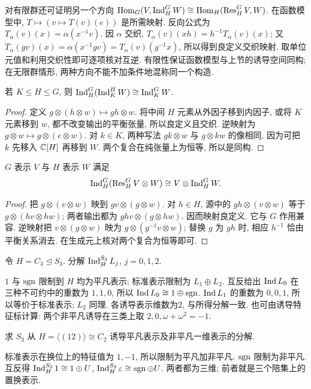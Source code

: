 对有限群还可证明另一个方向
$\operatorname{Hom}_G(V,\operatorname{Ind}_H^G W)\cong\operatorname{Hom}_H(\operatorname{Res}_H^G V,W)$. 在函数模型中, $T\mapsto(v\mapsto T(v)(e))$ 是所需映射. 反向公式为 $T_\alpha(v)(x)=\alpha(x^{-1}v)$. 因 $\alpha$ 交织,
$T_\alpha(v)(xh)=h^{-1}T_\alpha(v)(x)$; 又
$T_\alpha(gv)(x)=\alpha(x^{-1}gv)=T_\alpha(v)(g^{-1}x)$, 所以得到良定义交织映射. 取单位元值和利用交织性即可逐项核对互逆. 有限性保证函数模型与上节的诱导空间同构; 在无限群情形, 两种方向不能不加条件地混称同一个构造.

\begin{proposition}\label{prop:transitivity}
若 $K\le H\le G$, 则 $\operatorname{Ind}_H^G(\operatorname{Ind}_K^H W)\cong\operatorname{Ind}_K^G W$.
\end{proposition}
\begin{proof}
定义 $g\otimes(h\otimes w)\mapsto gh\otimes w$. 将中间 $H$ 元素从外因子移到内因子, 或将 $K$ 元素移到 $w$, 都不改变输出的平衡张量, 所以良定义且交织. 逆映射为 $g\otimes w\mapsto g\otimes(e\otimes w)$. 对 $k\in K$, 两种写法 $gk\otimes w$ 与 $g\otimes kw$ 的像相同, 因为可把 $k$ 先移入 $\mathbb C[H]$ 再移到 $W$. 两个复合在纯张量上为恒等, 所以是同构.
\end{proof}
\begin{proposition}\label{prop:projectionformula}
$G$ 表示 $V$ 与 $H$ 表示 $W$ 满足
\[
 \operatorname{Ind}_H^G(\operatorname{Res}_H^G V\otimes W)\cong V\otimes\operatorname{Ind}_H^G W.
\]
\end{proposition}
\begin{proof}
把 $g\otimes(v\otimes w)$ 映到 $gv\otimes(g\otimes w)$. 对 $h\in H$, 源中的 $gh\otimes(v\otimes w)$ 等于 $g\otimes(hv\otimes hw)$; 两者输出都为 $ghv\otimes(g\otimes hw)$. 因而映射良定义. 它与 $G$ 作用兼容. 逆映射把 $v\otimes(g\otimes w)$ 映为 $g\otimes(g^{-1}v\otimes w)$; 替换 $g$ 为 $gh$ 时, 相应 $h^{-1}$ 恰由平衡关系消去. 在生成元上核对两个复合为恒等即可.
\end{proof}

\begin{example}\label{ex:s3induction}
令 $H=C_3\trianglelefteq S_3$. 分解 $\operatorname{Ind}_H^{S_3}L_j$, $j=0,1,2$.
\end{example}
\begin{solution}
$1$ 与 $\operatorname{sgn}$ 限制到 $H$ 均为平凡表示; 标准表示限制为 $L_1\oplus L_2$. 互反给出 $\operatorname{Ind} L_0$ 在三种不可约中的重数为 $1,1,0$, 所以 $\operatorname{Ind} L_0\cong1\oplus\operatorname{sgn}$. $\operatorname{Ind} L_1$ 的重数为 $0,0,1$, 所以等价于标准表示; $L_2$ 同理. 各诱导表示维数为2, 与所得分解一致. 也可由诱导特征标计算: 两个非平凡诱导在三类上取 $2,0,\omega+\omega^2= -1$.
\end{solution}

\begin{exercise}
求 $S_3$ 从 $H=\langle(12)\rangle\cong C_2$ 诱导平凡表示及非平凡一维表示的分解.
\end{exercise}
\begin{solution}
标准表示在换位上的特征值为 $1,-1$, 所以限制为平凡加非平凡. $\operatorname{sgn}$ 限制为非平凡. 互反得 $\operatorname{Ind}_H^{S_3}1\cong1\oplus U$, $\operatorname{Ind}_H^{S_3}\varepsilon\cong\operatorname{sgn}\oplus U$. 两者都为三维; 前者就是三个陪集上的置换表示.
\end{solution}

